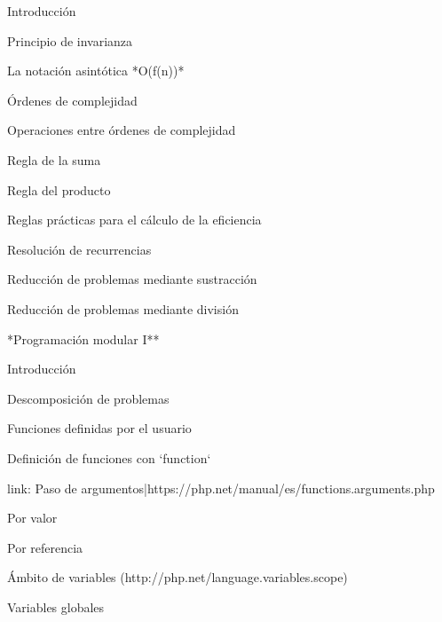 \begin{longenum}
    \begin{longenum}
        \item Introducción
        \item Principio de invarianza
        \item La notación asintótica *O(f(n))*
        \item Órdenes de complejidad
        \item Operaciones entre órdenes de complejidad
        \begin{longenum}
            \item Regla de la suma
            \item Regla del producto
        \end{longenum}
        \item Reglas prácticas para el cálculo de la eficiencia
        \item Resolución de recurrencias
        \begin{longenum}
            \item Reducción de problemas mediante sustracción
            \item Reducción de problemas mediante división
        \end{longenum}
    \end{longenum}
    \item **Programación modular I**
    \begin{longenum}
        \item Introducción
        \begin{longenum}
            \item Descomposición de problemas
        \end{longenum}
        \item Funciones definidas por el usuario
        \begin{longenum}
            \item Definición de funciones con `function`
            \item [link: Paso de argumentos|https://php.net/manual/es/functions.arguments.php]
            \begin{longenum}
                \item Por valor
                \item Por referencia
            \end{longenum}
            \item [Ámbito de variables](http://php.net/language.variables.scope)
            \begin{longenum}
                \item Variables globales

\end{longenum}
\end{longenum}
\end{longenum}
\end{longenum}
